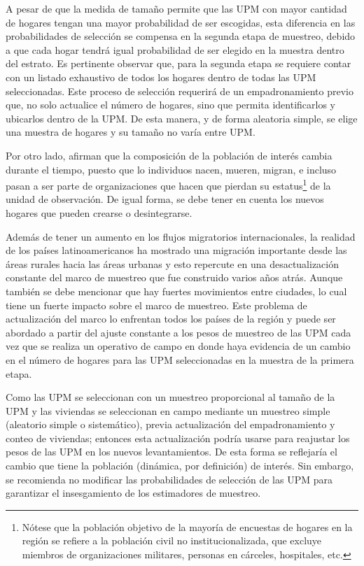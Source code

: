 \documentclass[
  12pt,
]{book}
\begin{document}
A pesar de que la medida de tamaño permite que las UPM con mayor cantidad de hogares tengan una mayor probabilidad de ser escogidas, esta diferencia en las probabilidades de selección se compensa en la segunda etapa de muestreo, debido a que cada hogar tendrá igual probabilidad de ser elegido en la muestra dentro del estrato. Es pertinente observar que, para la segunda etapa se requiere contar con un listado exhaustivo de todos los hogares dentro de todas las UPM seleccionadas. Este proceso de selección requerirá de un empadronamiento previo que, no solo actualice el número de hogares, sino que permita identificarlos y ubicarlos dentro de la UPM. De esta manera, y de forma aleatoria simple, se elige una muestra de hogares y su tamaño no varía entre UPM.

Por otro lado, \citet[pág. 105]{Duncan_Kalton_1987} afirman que la composición de la población de interés cambia durante el tiempo, puesto que lo individuos nacen, mueren, migran, e incluso pasan a ser parte de organizaciones que hacen que pierdan su estatus\footnote{Nótese que la población objetivo de la mayoría de encuestas de hogares en la región se refiere a la población civil no institucionalizada, que excluye miembros de organizaciones militares, personas en cárceles, hospitales, etc.} de la unidad de observación. De igual forma, se debe tener en cuenta los nuevos hogares que pueden crearse o desintegrarse.

Además de tener un aumento en los flujos migratorios internacionales, la realidad de los países latinoamericanos ha mostrado una migración importante desde las áreas rurales hacia las áreas urbanas y esto repercute en una desactualización constante del marco de muestreo que fue construido varios años atrás. Aunque también se debe mencionar que hay fuertes movimientos entre ciudades, lo cual tiene un fuerte impacto sobre el marco de muestreo. Este problema de actualización del marco lo enfrentan todos los países de la región y puede ser abordado a partir del ajuste constante a los pesos de muestreo de las UPM cada vez que se realiza un operativo de campo en donde haya evidencia de un cambio en el número de hogares para las UPM seleccionadas en la muestra de la primera etapa.

Como las UPM se seleccionan con un muestreo proporcional al tamaño de la UPM y las viviendas se seleccionan en campo mediante un muestreo simple (aleatorio simple o sistemático), previa actualización del empadronamiento y conteo de viviendas; entonces esta actualización podría usarse para reajustar los pesos de las UPM en los nuevos levantamientos. De esta forma se reflejaría el cambio que tiene la población (dinámica, por definición) de interés. Sin embargo, se recomienda no modificar las probabilidades de selección de las UPM para garantizar el insesgamiento de los estimadores de muestreo.
\end{document}
